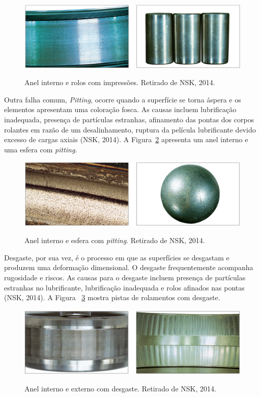 \documentclass[
	12pt,				
	oneside,			
	a4paper,			
	english,			
	brazil,			
	]{abntex2ppgsi}
\begin{document}
\begin{figure}[H]
\centering
\caption {Anel interno e rolos com impressões. Retirado de NSK, 2014.}
\includegraphics[width=\textwidth,height=\textheight,keepaspectratio]{impressoes_nsk}
\label{impressoes_nsk}
\end{figure}

Outra falha comum, \textit{Pitting}, ocorre quando a superfície se torna áspera e os elementos apresentam uma coloração fosca. As causas incluem lubrificação inadequada, presença de partículas estranhas, afinamento das pontas dos corpos rolantes em razão de um desalinhamento, ruptura da película lubrificante devido excesso de cargas axiais (NSK, 2014). A Figura~\ref{pitting_nsk} apresenta um anel interno e uma esfera com \textit{pitting}.

\begin{figure}[H]
\centering
\caption {Anel interno e esfera com \textit{pitting}. Retirado de NSK, 2014.}
\includegraphics[width=\textwidth,height=\textheight,keepaspectratio]{pitting_nsk}
\label{pitting_nsk}
\end{figure}

Desgaste, por sua vez, é o processo em que as superfícies se desgastam e produzem uma deformação dimensional. O desgaste frequentemente acompanha rugosidade e riscos. As causas para o desgaste incluem presença de partículas estranhas no lubrificante, lubrificação inadequada e rolos afinados nas pontas (NSK, 2014). A Figura ~\ref{desgaste_nsk} mostra pistas de rolamentos com desgaste.

\begin{figure}[H]
\centering
\caption {Anel interno e externo com desgaste. Retirado de NSK, 2014.}
\includegraphics[width=\textwidth,height=\textheight,keepaspectratio]{desgaste_nsk}
\label{desgaste_nsk}
\end{figure}
\end{document}
